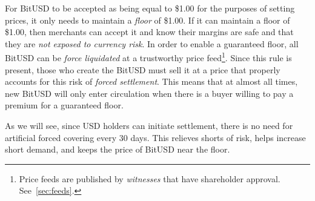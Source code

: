 For BitUSD to be accepted as being equal to \$1.00 for the purposes of setting
prices, it only needs to maintain a \emph{floor} of \$1.00. If it can maintain
a floor of \$1.00, then merchants can accept it and know their margins are safe
and that they are \emph{not exposed to currency risk}. In order to enable a
guaranteed floor, all BitUSD can be \emph{force liquidated} at a trustworthy
price feed\footnote{Price feeds are published by \emph{witnesses} that have
shareholder approval. See~\cref{sec:feeds}.}. Since this rule is present,
those who create the BitUSD must sell it at a price that properly accounts for
this risk of \emph{forced settlement}. This means that at almost all times, new
BitUSD will only enter circulation when there is a buyer willing to pay a
premium for a guaranteed floor.

As we will see, since USD holders can initiate settlement, there is no need for
artificial forced covering every 30 days. This relieves shorts of risk, helps
increase short demand, and keeps the price of BitUSD near the floor.
